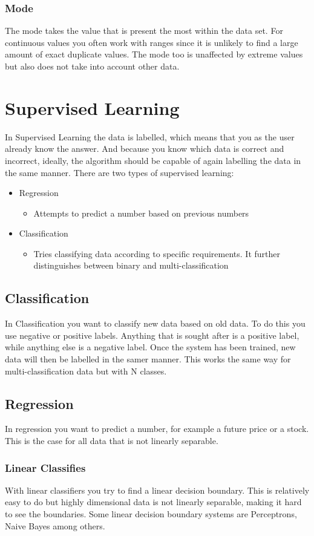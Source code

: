 \documentclass{article}
\begin{document}
	\subsubsection{Mode}
	The mode takes the value that is present the most within the data set. For continuous values you often work with ranges since it is unlikely to find a large amount of exact duplicate values. The mode too is unaffected by extreme values but also does not take into account other data.
	\section{Supervised Learning}
	In Supervised Learning the data is labelled, which means that you as the user already know the answer. And because you know which data is correct and incorrect, ideally, the algorithm should be capable of again labelling the data in the same manner.
	There are two types of supervised learning:
	\begin{itemize}
		\item{Regression}
		\begin{itemize}
			\item{Attempts to predict a number based on previous numbers}
		\end{itemize}
		\item{Classification}
		\begin{itemize}
			\item{Tries classifying data according to specific requirements. It further distinguishes between binary and multi-classification}
		\end{itemize}
	\end{itemize}
	\subsection{Classification}
	In Classification you want to classify new data based on old data. To do this you use negative or positive labels. Anything that is sought after is a positive label, while anything else is a negative label. Once the system has been trained, new data will then be labelled in the samer manner. This works the same way for multi-classification data but with N classes.
	\subsection{Regression}
	In regression you want to predict a number, for example a future price or a stock. This is the case for all data that is not linearly separable.
	\subsubsection{Linear Classifies}
	With linear classifiers you try to find a linear decision boundary. This is relatively easy to do but highly dimensional data is not linearly separable, making it hard to see the boundaries. Some linear decision boundary systems are Perceptrons, Naive Bayes among others.
\end{document}
